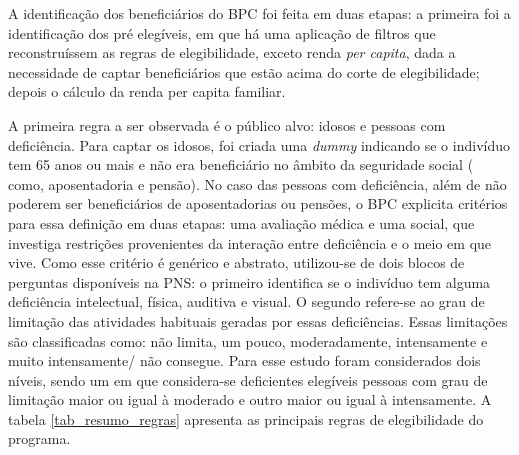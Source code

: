 \documentclass[
	12pt,				%
	openright,			%
	twoside,			%
	a4paper,			%
	english,			%
	french,				%
	spanish,			%
	brazil				%
	]{abntex2}
\begin{document}
	A identificação dos beneficiários do BPC foi feita em duas etapas: a primeira foi a identificação dos pré elegíveis, em que há uma aplicação de filtros que reconstruíssem as regras de elegibilidade, exceto renda \textit{per capita}, dada a necessidade de captar beneficiários que estão acima do corte de elegibilidade; depois o cálculo da renda per capita familiar.
	
	A primeira regra a ser observada é o público alvo: idosos e pessoas com deficiência. Para captar os idosos, foi criada uma \textit{dummy} indicando se o indivíduo tem 65 anos ou mais e não era beneficiário no âmbito da seguridade social ( como, aposentadoria e pensão). No caso das pessoas com deficiência, além de não poderem ser beneficiários de aposentadorias ou pensões, o BPC explicita critérios para essa definição em duas etapas: uma avaliação médica e uma social, que investiga restrições provenientes da interação entre deficiência e o meio em que vive. Como esse critério é genérico e abstrato, utilizou-se de dois blocos de perguntas disponíveis na PNS: o primeiro identifica se o indivíduo tem alguma deficiência intelectual, física, auditiva e visual. O segundo refere-se ao grau de limitação das atividades habituais geradas por essas deficiências. Essas limitações são  classificadas como: não limita, um pouco, moderadamente, intensamente e muito intensamente/ não consegue. Para esse estudo foram considerados dois níveis, sendo um em que considera-se deficientes elegíveis pessoas com grau de limitação maior ou igual à moderado e outro maior ou igual à intensamente. A tabela \ref*{tab_resumo_regras} apresenta as principais regras de elegibilidade do programa.
	
\end{document}
